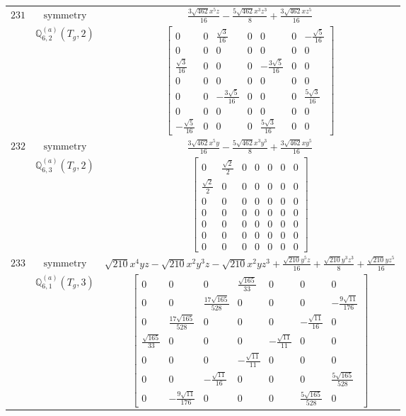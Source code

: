 \documentclass[fleqn,8pt,landscape]{jsarticle}
\begin{document}
\begin{longtable}{ccc}
$ 231 $ & $ \text{symmetry} $ & $ \frac{3 \sqrt{462} x^{5} z}{16} - \frac{5 \sqrt{462} x^{3} z^{3}}{8} + \frac{3 \sqrt{462} x z^{5}}{16} $ \\
$  $ & $ \mathbb{Q}_{6,2}^{(a)}(T_{g},2) $ & $ \begin{bmatrix} 0 & 0 & \frac{\sqrt{3}}{16} & 0 & 0 & 0 & - \frac{\sqrt{5}}{16} \\ 0 & 0 & 0 & 0 & 0 & 0 & 0 \\ \frac{\sqrt{3}}{16} & 0 & 0 & 0 & - \frac{3 \sqrt{5}}{16} & 0 & 0 \\ 0 & 0 & 0 & 0 & 0 & 0 & 0 \\ 0 & 0 & - \frac{3 \sqrt{5}}{16} & 0 & 0 & 0 & \frac{5 \sqrt{3}}{16} \\ 0 & 0 & 0 & 0 & 0 & 0 & 0 \\ - \frac{\sqrt{5}}{16} & 0 & 0 & 0 & \frac{5 \sqrt{3}}{16} & 0 & 0 \end{bmatrix} $ \\ \hline
$ 232 $ & $ \text{symmetry} $ & $ \frac{3 \sqrt{462} x^{5} y}{16} - \frac{5 \sqrt{462} x^{3} y^{3}}{8} + \frac{3 \sqrt{462} x y^{5}}{16} $ \\
$  $ & $ \mathbb{Q}_{6,3}^{(a)}(T_{g},2) $ & $ \begin{bmatrix} 0 & \frac{\sqrt{2}}{2} & 0 & 0 & 0 & 0 & 0 \\ \frac{\sqrt{2}}{2} & 0 & 0 & 0 & 0 & 0 & 0 \\ 0 & 0 & 0 & 0 & 0 & 0 & 0 \\ 0 & 0 & 0 & 0 & 0 & 0 & 0 \\ 0 & 0 & 0 & 0 & 0 & 0 & 0 \\ 0 & 0 & 0 & 0 & 0 & 0 & 0 \\ 0 & 0 & 0 & 0 & 0 & 0 & 0 \end{bmatrix} $ \\ \hline
$ 233 $ & $ \text{symmetry} $ & $ \sqrt{210} x^{4} y z - \sqrt{210} x^{2} y^{3} z - \sqrt{210} x^{2} y z^{3} + \frac{\sqrt{210} y^{5} z}{16} + \frac{\sqrt{210} y^{3} z^{3}}{8} + \frac{\sqrt{210} y z^{5}}{16} $ \\
$  $ & $ \mathbb{Q}_{6,1}^{(a)}(T_{g},3) $ & $ \begin{bmatrix} 0 & 0 & 0 & \frac{\sqrt{165}}{33} & 0 & 0 & 0 \\ 0 & 0 & \frac{17 \sqrt{165}}{528} & 0 & 0 & 0 & - \frac{9 \sqrt{11}}{176} \\ 0 & \frac{17 \sqrt{165}}{528} & 0 & 0 & 0 & - \frac{\sqrt{11}}{16} & 0 \\ \frac{\sqrt{165}}{33} & 0 & 0 & 0 & - \frac{\sqrt{11}}{11} & 0 & 0 \\ 0 & 0 & 0 & - \frac{\sqrt{11}}{11} & 0 & 0 & 0 \\ 0 & 0 & - \frac{\sqrt{11}}{16} & 0 & 0 & 0 & \frac{5 \sqrt{165}}{528} \\ 0 & - \frac{9 \sqrt{11}}{176} & 0 & 0 & 0 & \frac{5 \sqrt{165}}{528} & 0 \end{bmatrix} $ \\ \hline

\end{longtable}
\end{document}
